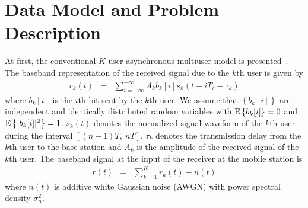 \documentclass[a4paper,10pt,fleqn, twocolumn]{IEEETran}
\begin{document}
\section{Data Model and Problem Description}
At first, the conventional $K$-user asynchronous multiuser model
is presented~\cite{Verd98}. The baseband representation of the
received signal due to the $k$th user is given by
\begin{equation}
\begin{array}{rcl}
r_k(t)&=&\sum\limits_{i=-\infty}^{+\infty}A_k b_k[i]
s_k(t-iT_c-\tau_k)
\end{array}
\end{equation}
\noindent where $b_k[i]$ is the $i$th bit sent by the $k$th user.
We assume that $\left\{b_k[i]\right\}$ are independent and
identically distributed random variables with ${\rm
E}\left\{b_k[i]\right\}=0$ and ${\rm
E}\left\{|b_k[i]|^2\right\}=1$. $s_k(t)$ denotes the normalized
signal waveform of the $k$th user during the interval $[(n-1)T,\
nT]$, $\tau_k$ denotes the transmission delay from the $k$th user
to the base station and $A_k$ is the amplitude of the received
signal of the $k$th user. The baseband signal at the input of the
receiver at the mobile station is
\begin{equation}
\begin{array}{rcl}
r(t)&=&\sum\limits_{k=1}^{K}r_k(t)+n(t)
\end{array}
\end{equation}
\noindent where $n(t)$ is additive white Gaussian noise (AWGN)
with power spectral density $\sigma_n^2$.
\end{document}
